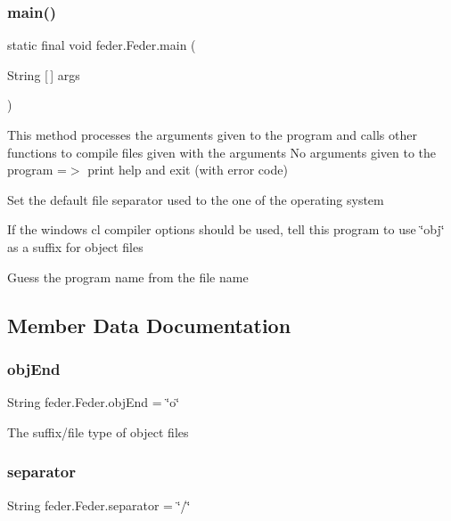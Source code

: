 \subsubsection{\texorpdfstring{main()}{main()}}
{\footnotesize\ttfamily static final void feder.\+Feder.\+main (\begin{DoxyParamCaption}\item[{String \mbox{[}$\,$\mbox{]}}]{args }\end{DoxyParamCaption})\hspace{0.3cm}{\ttfamily [static]}}

This method processes the arguments given to the program and calls other functions to compile files given with the arguments No arguments given to the program =$>$ print help and exit (with error code)

Set the default file separator used to the one of the operating system

If the windows cl compiler options should be used, tell this program to use \char`\"{}obj\char`\"{} as a suffix for object files

Guess the program name from the file name

\subsection{Member Data Documentation}
\mbox{\label{classfeder_1_1Feder_a456aa8c75c4f593438f11c8bfccbc030}} 
\subsubsection{\texorpdfstring{obj\+End}{objEnd}}
{\footnotesize\ttfamily String feder.\+Feder.\+obj\+End = \char`\"{}o\char`\"{}\hspace{0.3cm}{\ttfamily [static]}}

The suffix/file type of object files \mbox{\label{classfeder_1_1Feder_af14a275c06d1155a8cbe776cf7a156eb}} 
\subsubsection{\texorpdfstring{separator}{separator}}
{\footnotesize\ttfamily String feder.\+Feder.\+separator = \char`\"{}/\char`\"{}\hspace{0.3cm}{\ttfamily [static]}}

